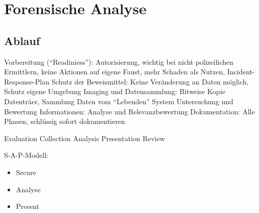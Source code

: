 \chapter{Forensische Analyse}
\section{Ablauf}
Vorbereitung ("`Readiniess"'): Autorisierung, wichtig bei nicht polizeilichen Ermittlern, keine Aktionen auf eigene Faust, mehr Schaden als Nutzen, Incident-Response-Plan
Schutz der Beweismittel: Keine Veränderung an Daten möglich, Schutz eigene Umgebung
Imaging und Datensammlung: Bitweise Kopie Datenträer, Sammlung Daten vom "`Lebenden"' System
Untersuchung und Bewertung Informationen: Analyse und Relevanzbewertung
Dokumentation: Alle Phasen, schlüssig sofort dokumentieren

Evaluation 
Collection
Analysis
Presentation
Review

S-A-P-Modell:
\begin{itemize}
\item Secure
\item Analyse
\item Present
\end{itemize}

